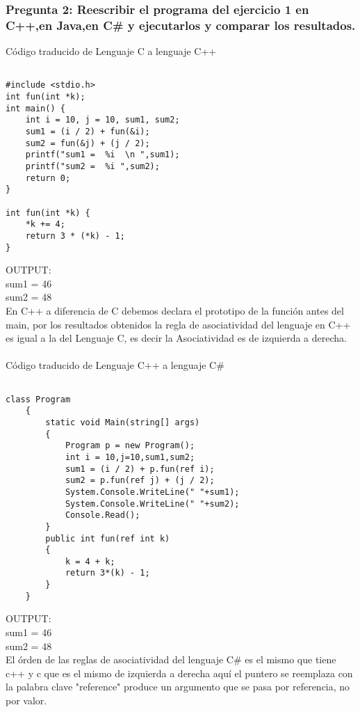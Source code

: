 \subsubsection{Pregunta 2: Reescribir el programa del ejercicio 1 en C++,en Java,en C\# y ejecutarlos y comparar los resultados.}
\lstset{language = C++}  %
Código traducido de Lenguaje C a lenguaje C++
\begin{lstlisting}[frame = single] %Comienzo del Código

#include <stdio.h>
int fun(int *k);
int main() {
    int i = 10, j = 10, sum1, sum2;
    sum1 = (i / 2) + fun(&i);
    sum2 = fun(&j) + (j / 2);
    printf("sum1 =  %i  \n ",sum1);
    printf("sum2 =  %i ",sum2);
    return 0;
}

int fun(int *k) {
    *k += 4;
    return 3 * (*k) - 1;
}
\end{lstlisting}
OUTPUT:\\
	sum1 =  46\\
	sum2 =  48\\
En C++ a diferencia de C debemos declara el prototipo de la función antes del main, por los resultados obtenidos la regla de asociatividad del lenguaje en C++ es igual a la del Lenguaje C, es decir la Asociatividad es de izquierda a derecha.\\\\
\lstset{language = C}  %
Código traducido de Lenguaje C++ a lenguaje C\#
\begin{lstlisting}[frame = single] %Comienzo del Código

class Program
    {
        static void Main(string[] args)
        {
            Program p = new Program();
            int i = 10,j=10,sum1,sum2;
            sum1 = (i / 2) + p.fun(ref i);
            sum2 = p.fun(ref j) + (j / 2);
            System.Console.WriteLine(" "+sum1);
            System.Console.WriteLine(" "+sum2);
            Console.Read();
        }
        public int fun(ref int k)
        {
            k = 4 + k;
            return 3*(k) - 1;
        }
    }
\end{lstlisting}
OUTPUT:\\
	sum1 =  46\\
	sum2 =  48\\
El órden de las reglas de asociatividad del lenguaje C\# es el mismo que tiene c++ y c que es el mismo de izquierda a derecha aquí el puntero se reemplaza con la palabra clave "reference" produce un argumento que se pasa por referencia, no por valor.\\\\
